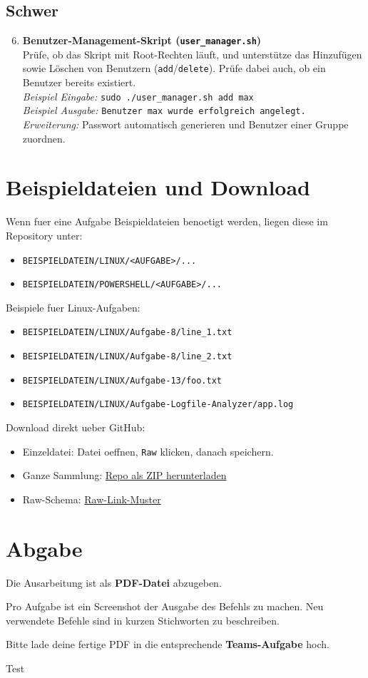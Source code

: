 \documentclass[11pt, oneside, numbers=nönddot]{scrbook}
\begin{document}
\section{Schwer}
\begin{enumerate}
\setcounter{enumi}{5}
\item \textbf{Benutzer-Management-Skript (\texttt{user\_manager.sh})}\\
Prüfe, ob das Skript mit Root-Rechten läuft, und unterstütze das Hinzufügen sowie Löschen von Benutzern (\texttt{add}/\texttt{delete}). Prüfe dabei auch, ob ein Benutzer bereits existiert.\\
\textit{Beispiel Eingabe:} \texttt{sudo ./user\_manager.sh add max}\\
\textit{Beispiel Ausgabe:} \texttt{Benutzer max wurde erfolgreich angelegt.}\\
\textit{Erweiterung:} Passwort automatisch generieren und Benutzer einer Gruppe zuordnen.
\end{enumerate}


\chapter{Beispieldateien und Download}
Wenn fuer eine Aufgabe Beispieldateien benoetigt werden, liegen diese im Repository unter:
\begin{itemize}
\item \texttt{BEISPIELDATEIN/LINUX/<AUFGABE>/...}
\item \texttt{BEISPIELDATEIN/POWERSHELL/<AUFGABE>/...}
\end{itemize}

Beispiele fuer Linux-Aufgaben:
\begin{itemize}
\item \texttt{BEISPIELDATEIN/LINUX/Aufgabe-8/line\_1.txt}
\item \texttt{BEISPIELDATEIN/LINUX/Aufgabe-8/line\_2.txt}
\item \texttt{BEISPIELDATEIN/LINUX/Aufgabe-13/foo.txt}
\item \texttt{BEISPIELDATEIN/LINUX/Aufgabe-Logfile-Analyzer/app.log}
\end{itemize}

Download direkt ueber GitHub:
\begin{itemize}
\item Einzeldatei: Datei oeffnen, \texttt{Raw} klicken, danach speichern.
\item Ganze Sammlung: \href{https://github.com/michelroegl-brunner/HTL-Braunau/archive/refs/heads/main.zip}{Repo als ZIP herunterladen}
\item Raw-Schema: \href{https://raw.githubusercontent.com/michelroegl-brunner/HTL-Braunau/main/BEISPIELDATEIN/<AUFGABE>/<DATEI>}{Raw-Link-Muster}
\end{itemize}

\chapter{Abgabe}
Die Ausarbeitung ist als \textbf{PDF-Datei} abzugeben.

Pro Aufgabe ist ein Screenshot der Ausgabe des Befehls zu machen.
Neu verwendete Befehle sind in kurzen Stichworten zu beschreiben.

Bitte lade deine fertige PDF in die entsprechende \textbf{Teams-Aufgabe} hoch.

Test
\end{document}

